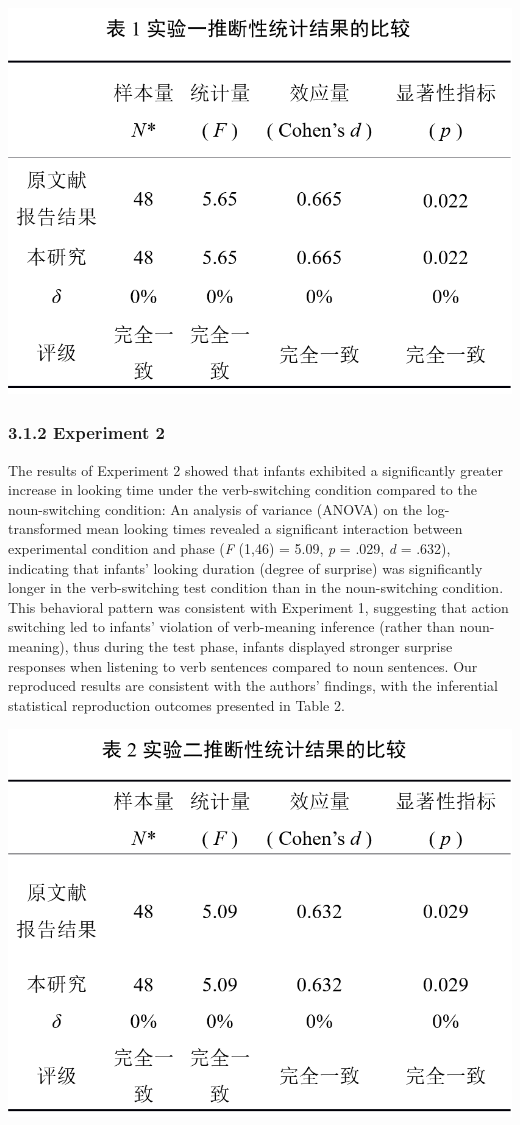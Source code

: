 \documentclass[
  man]{apa6}
\begin{document}
\includegraphics{pic/table_1.png}

\subsubsection{3.1.2 Experiment 2}\label{experiment-2}

The results of Experiment 2 showed that infants exhibited a significantly greater increase in looking time under the verb-switching condition compared to the noun-switching condition: An analysis of variance (ANOVA) on the log-transformed mean looking times revealed a significant interaction between experimental condition and phase (\emph{F} (1,46) = 5.09, \emph{p} = .029, \emph{d} = .632), indicating that infants' looking duration (degree of surprise) was significantly longer in the verb-switching test condition than in the noun-switching condition. This behavioral pattern was consistent with Experiment 1, suggesting that action switching led to infants' violation of verb-meaning inference (rather than noun-meaning), thus during the test phase, infants displayed stronger surprise responses when listening to verb sentences compared to noun sentences. Our reproduced results are consistent with the authors' findings, with the inferential statistical reproduction outcomes presented in Table 2.

\includegraphics{pic/table_2.png}
\end{document}
